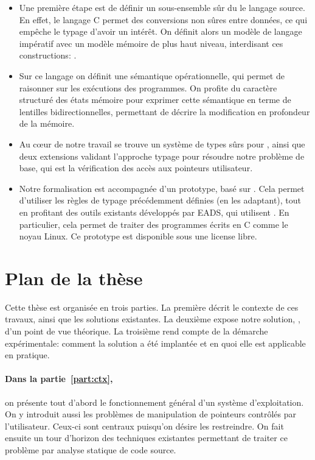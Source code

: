 \begin{itemize}

\item
Une première étape est de définir un sous-ensemble sûr du le langage source. En
effet, le langage C permet des conversions non sûres entre données, ce qui
empêche le typage d'avoir un intérêt. On définit alors un modèle de langage
impératif avec un modèle mémoire de plus haut niveau, interdisant ces
constructions: \langname.

\item
Sur ce langage on définit une sémantique opérationnelle, qui permet de raisonner
sur les exécutions des programmes. On profite du caractère structuré des états
mémoire pour exprimer cette sémantique en terme de lentilles bidirectionnelles,
permettant de décrire la modification en profondeur de la mémoire.

\item
Au cœur de notre travail se trouve un système de types sûrs pour \langname,
ainsi que deux extensions validant l'approche typage pour résoudre notre
problème de base, qui est la vérification des accès aux pointeurs utilisateur.


\item
Notre formalisation est accompagnée d'un prototype, basé sur \newspeak. Cela
permet d'utiliser les règles de typage précédemment définies (en les adaptant),
tout en profitant des outils existants développés par EADS, qui utilisent
\newspeak. En particulier, cela permet de traiter des programmes écrits en C
comme le noyau Linux. Ce prototype est disponible sous une license libre.


\end{itemize}

\section{Plan de la thèse}

Cette thèse est organisée en trois parties. La première décrit le contexte de
ces travaux, ainsi que les solutions existantes. La deuxième expose notre
solution, \langname, d'un point de vue théorique. La troisième rend compte de la
démarche expérimentale: comment la solution a été implantée et en quoi elle est
applicable en pratique.

\paragraph{Dans la partie~\ref{part:ctx},} on présente tout d'abord le
fonctionnement général d'un système d'exploitation. On y introduit aussi les
problèmes de manipulation de pointeurs contrôlés par l'utilisateur. Ceux-ci sont
centraux puisqu'on désire les restreindre. On fait ensuite un tour d'horizon des
techniques existantes permettant de traiter ce problème par analyse statique de
code source.

